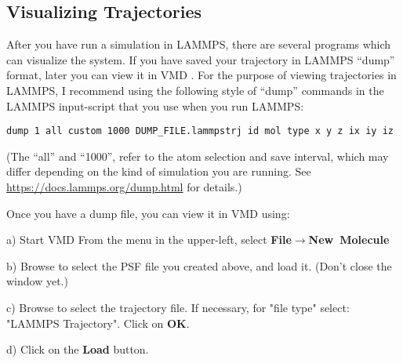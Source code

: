 \documentclass[11pt]{article}
\begin{document}



\subsection{Visualizing Trajectories}
\label{sec:vmd_trajectory}
After you have run a simulation in LAMMPS, there are several programs which
can visualize the system.
If you have saved your trajectory in LAMMPS ``dump'' format,
later you can view it in VMD \cite{VMD}.
For the purpose of viewing trajectories in LAMMPS, 
I recommend using the following style of ``dump'' commands in the LAMMPS 
input-script that you use when you run LAMMPS:
\begin{verbatim}
dump 1 all custom 1000 DUMP_FILE.lammpstrj id mol type x y z ix iy iz
\end{verbatim}
(The ``all'' and ``1000'', refer to the atom selection and save interval, which may differ depending on the kind of simulation you are running.  See \url{https://docs.lammps.org/dump.html} for details.)


Once you have a dump file, you can view it in VMD using:
\begin{list}{}
\item a) Start VMD
  From the menu in the upper-left, select 
  \textbf{File}$\rightarrow$\mbox{\textbf{New Molecule}}
\item b) Browse to select the PSF file you created above, and load it.
  (Don't close the window yet.)
\item c) Browse to select the trajectory file.
  If necessary, for "file type" select: "LAMMPS Trajectory".  
  Click on \textbf{OK}.
\item d) Click on the \textbf{Load} button.
\end{list}
\end{document}
